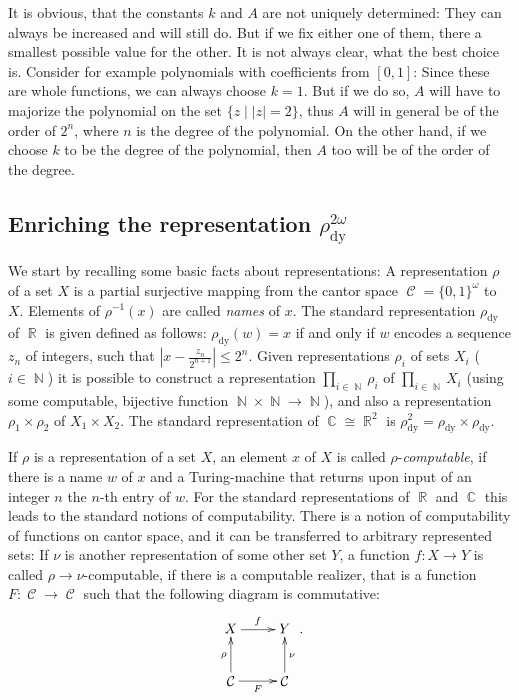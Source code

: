 \documentclass{article}
\DeclareMathOperator{\NN}{\ensuremath{\mathbb{N}}\xspace}
\DeclareMathOperator{\RR}{\ensuremath{\mathbb{R}}\xspace}
\DeclareMathOperator{\CC}{\ensuremath{\mathbb{C}}\xspace}
\DeclareMathOperator{\can}{\ensuremath{\mathcal{C}}\xspace}
\begin{document}
It is obvious, that the constants $k$ and $A$ are not uniquely determined: They can always be increased and will still do. But if we fix either one of them, there a smallest possible value for the other. It is not always clear, what the best choice is. Consider for example polynomials with coefficients from $[0,1]$: Since these are whole functions, we can always choose $k=1$. But if we do so, $A$ will have to majorize the polynomial on the set $\{z\mid |z| =2\}$, thus $A$ will in general be of the order of $2^n$, where $n$ is the degree of the polynomial. On the other hand, if we choose $k$ to be the degree of the polynomial, then $A$ too will be of the order of the degree.

\subsection[Enriching the representation]{Enriching the representation $\rho_{\mathrm{dy}}^{2\omega}$}

We start by recalling some basic facts about representations: A representation $\rho$ of a set $X$ is a partial surjective mapping from the cantor space $\can = \{0,1\}^\omega$ to $X$. Elements of $\rho^{-1}(x)$ are called \emph{names} of $x$. The standard representation $\rho_{\mathrm{dy}}$ of $\RR$ is given defined as follows: $\rho_{\mathrm{dy}}(w) = x$ if and only if $w$ encodes a sequence $z_n$ of integers, such that $\left|x - \frac{z_n}{2^{n+1}}\right| \leq 2^n$. Given representations $\rho_i$ of sets $X_i$ ($i\in \NN$) it is possible to construct a representation $\prod_{i\in \NN} \rho_i$ of $\prod_{i\in \NN} X_i$ (using some computable, bijective function $\NN\times\NN\to\NN$), and also a representation $\rho_1 \times \rho_2$ of $X_1 \times X_2$. The standard representation of $\CC \cong \RR^2$ is $\rho^2_{\mathrm{dy}} = \rho_{\mathrm{dy}} \times \rho_{\mathrm{dy}}$.

If $\rho$ is a representation of a set $X$, an element $x$ of $X$ is called $\rho$-\emph{computable}, if there is a name $w$ of $x$ and a Turing-machine that returns upon input of an integer $n$ the $n$-th entry of $w$. For the standard representations of $\RR$ and $\CC$ this leads to the standard notions of computability. There is a notion of computability of functions on cantor space, and it can be transferred to arbitrary represented sets: If $\nu$ is another representation of some other set $Y$, a function $f:X\to Y$ is called $\rho\to\nu$-computable, if there is a computable realizer, that is a function $F:\can\to\can$ such that the following diagram is commutative:
\[ \begin{xy}
\xymatrix{X\ar[r]^f & Y \\ \can \ar[r]_F\ar[u]^\rho & \can \ar[u]_\nu}
\end{xy}. \]
\end{document}
